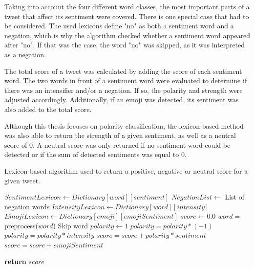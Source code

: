 Taking into account the four different word classes, the most important parts of a tweet that affect its sentiment were covered. There is one special case that had to be considered. The used lexicons define "no" as both a sentiment word and a negation, which is why the algorithm checked whether a sentiment word appeared after "no". If that was the case, the word "no" was skipped, as it was interpreted as a negation.

The total score of a tweet was calculated by adding the score of each sentiment word. The two words in front of a sentiment word were evaluated to determine if there was an intensifier and/or a negation. If so, the polarity and strength were adjusted accordingly. Additionally, if an emoji was detected, its sentiment was also added to the total score.

Although this thesis focuses on polarity classification, the lexicon-based method was also able to return the strength of a given sentiment, as well as a neutral score of 0. A neutral score was only returned if no sentiment word could be detected or if the sum of detected sentiments was equal to 0.

\begin{algorithm}
  \caption{Lexicon-based algorithm used to return a positive, negative or neutral score for a given tweet.}\label{lexiconAlg}
    \begin{algorithmic}[1]
            \State $SentimentLexicon \gets Dictionary[word][sentiment]$
            \State $NegationList \gets$ List of negation words
            \State $IntensityLexicon \gets Dictionary[word][intensity]$
            \State $EmojiLexicon \gets Dictionary[emoji][emojiSentiment]$ 
            \State $score \gets 0.0$
                \State $word =$ preprocess($word$)
                            \State Skip word
                        \EndIf
                        \EndFor
                \Else
                \State $polarity \gets 1$
                            \State $polarity = polarity * (-1)$
                        \Else
                                \State $polarity = polarity * intensity$
                            \EndIf
                        \EndIf
                    \EndFor
                    \State $score = score + polarity * sentiment$
                \EndIf 
                \Else
                        \State $score = score + emojiSentiment$
                    \EndIf
                \EndIf 

            \EndFor
            \State \textbf{return} $score$
        \EndFunction
    \end{algorithmic}
\end{algorithm}

